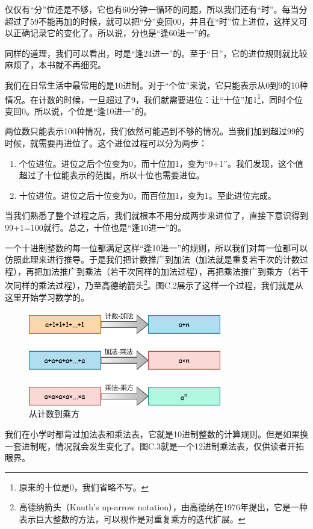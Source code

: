仅仅有``分''位还是不够，它也有60分钟一循环的问题，所以我们还有``时''。每当分超过了59不能再加的时候，就可以把``分''变回00，并且在``时''位上进位，这样又可以正确记录它的变化了。所以说，分也是``逢60进一''的。\par
同样的道理，我们可以看出，时是``逢24进一''的。至于``日''，它的进位规则就比较麻烦了，本书就不再细究。\par
我们在日常生活中最常用的是10进制。对于``个位''来说，它只能表示从0到9的10种情况。在计数的时候，一旦超过了9，我们就需要进位：让``十位''加1\footnote{原来的十位是0，我们省略不写。}，同时个位变回0。所以说，个位是``逢10进一''的。\par
两位数只能表示100种情况，我们依然可能遇到不够的情况。当我们加到超过99的时候，就需要再进位了。这个进位过程可以分为两步：
\begin{enumerate}
    \item 个位进位。进位之后个位变为0，而十位加1，变为``9+1''。我们发现，这个值超过了十位能表示的范围，所以十位也需要进位。
    \item 十位进位。进位之后十位变为0，而百位加1，变为1。至此进位完成。
\end{enumerate}
当我们熟悉了整个过程之后，我们就根本不用分成两步来进位了，直接下意识得到99+1=100就行。总之，十位也是``逢10进一''的。\par
一个十进制整数的每一位都满足这样``逢10进一''的规则，所以我们对每一位都可以仿照此理来进行推导。于是我们把计数推广到加法（加法就是重复若干次的计数过程），再把加法推广到乘法（若干次同样的加法过程），再把乘法推广到乘方（若干次同样的乘法过程），乃至高德纳箭头\footnote{高德纳箭头（Knuth's up-arrow notation），由高德纳在1976年提出，它是一种表示巨大整数的方法，可以视作是对重复乘方的迭代扩展。}。图C.2展示了这样一个过程，我们就是从这里开始学习数学的。\par
\begin{figure}[htbp]
    \centering
    \includegraphics[width=0.75\textwidth]{../images/other_parts/C_from_counting_to_exponentiation.drawio.png}
    \caption{从计数到乘方}
\end{figure}
我们在小学时都背过加法表和乘法表，它就是10进制整数的计算规则。但是如果换一套进制呢，情况就会发生变化了。图C.3就是一个12进制乘法表，仅供读者开拓眼界。\par
